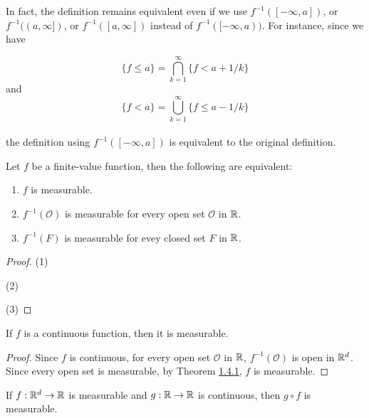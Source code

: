 \documentclass[12pt, a4paper, openany, twoside]{book}
\theoremstyle{definition}
\theoremstyle{remark}
\theoremstyle{plain}
\numberwithin{equation}{section}
\begin{document}
In fact, the definition remains equivalent even if we use $f^{-1}([-\infty,a])$, or $f^{-1}((a,\infty])$, or $f^{-1}([a,\infty])$ instead of $f^{-1}([-\infty,a))$. For instance, since we have

\[\{f\leq a\}=\bigcap_{k=1}^{\infty}{\{f<a+1/k\}}\]
and 
\[\{f<a\}=\bigcup_{k=1}^{\infty}{\{f\leq a-1/k\}}\]
\\
the definition using $f^{-1}([-\infty,a])$ is equivalent to the original definition. 

\vspace{5mm}
\begin{tcolorbox}[colback=yellow!10!white,colframe=red!75!black,title=Theorem 1.4.1]\label{Theorem 1.4.1}
    Let $f$ be a finite-value function, then the following are equivalent:
    \begin{enumerate}
        \item [(1)] $f$ is measurable.
        \item [(2)] $f^{-1}(\mathcal{O})$ is measurable for every open set $\mathcal{O}$ in ${\mathbb {R}}$.
        \item [(3)] $f^{-1}(F)$ is measurable for evey closed set $F$ in ${\mathbb {R}}$.
    \end{enumerate}
\end{tcolorbox}
\begin{proof}
    (1)

    \vspace{5mm}
    (2)

    \vspace{5mm}
    (3)
\end{proof}
\vspace{5mm}
\begin{tcolorbox}[colback=yellow!10!white,colframe=red!75!black,title=Corollary 1.4.2]\label{Corollary 1.4.2}
    If $f$ is a continuous function, then it is measurable.
\end{tcolorbox}
\begin{proof}
    Since $f$ is continuous, for every open set $\mathcal{O}$ in ${\mathbb {R}}$, $f^{-1}(\mathcal{O})$ is open in ${\mathbb {R}}^d$. Since every open set is measurable, by Theorem \hyperref[Theorem 1.4.1]{1.4.1}, $f$ is measurable.
\end{proof}
\vspace{5mm}
\begin{tcolorbox}[colback=yellow!10!white,colframe=red!75!black,title=Corollary 1.4.3]\label{Corollary 1.4.3}
    If $f:{\mathbb {R}}^d\rightarrow{\mathbb {R}}$ is measurable and $g:{\mathbb {R}}\rightarrow{\mathbb {R}}$ is continuous, then $g\circ f$ is measurable.
\end{tcolorbox}
\end{document}
